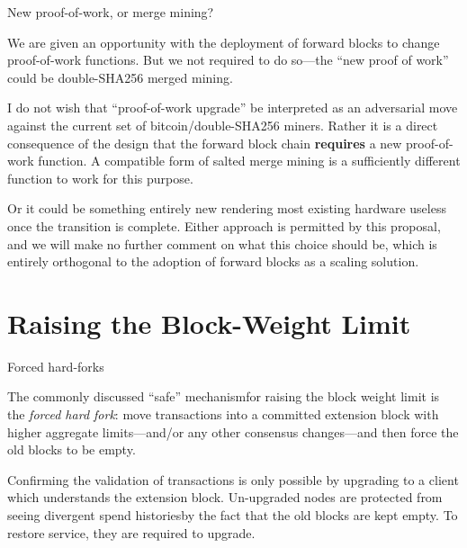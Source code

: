 \documentclass[10pt]{beamer}
\begin{document}
\begin{frame}{New proof-of-work, or merge mining?}

  We are given an opportunity with the deployment of forward blocks to
  change proof-of-work functions.  But we not required to do so---the
  ``new proof of work'' could be double-SHA256 merged mining.

  I do not wish that ``proof-of-work upgrade'' be interpreted as an
  adversarial move against the current set of bitcoin/double-SHA256
  miners.  Rather it is a direct consequence of the design that the
  forward block chain \textbf{requires} a new proof-of-work function.
  A compatible form of salted merge mining is a sufficiently different
  function to work for this purpose.

  Or it could be something entirely new rendering most existing
  hardware useless once the transition is complete.  Either approach
  is permitted by this proposal, and we will make no further comment
  on what this choice should be, which is entirely orthogonal to the
  adoption of forward blocks as a scaling solution.

\end{frame}

\section{Raising the Block-Weight Limit}

\begin{frame}{Forced hard-forks}

  The commonly discussed ``safe'' mechanism\footnotemark for raising
  the block weight limit is the \emph{forced hard fork}: move
  transactions into a committed extension block with higher aggregate
  limits---and/or any other consensus changes---and then force the old
  blocks to be empty.


  Confirming the validation of transactions is only possible by
  upgrading to a client which understands the extension block.
  Un-upgraded nodes are protected from seeing divergent spend
  histories\footnotemark by the fact that the old blocks are kept
  empty.  To restore service, they are required to upgrade.


\end{frame}
\end{document}
